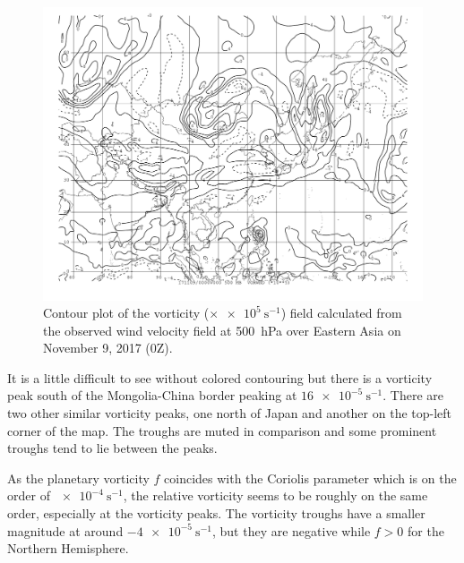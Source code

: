 \documentclass[11pt]{article}
\begin{document}
\begin{figure}[h!]
	\centering
	\includegraphics[width=\textwidth]{vorwnd_obs_500hPa_China}
	\caption{Contour plot of the vorticity ($\times \SI{e5}{\s^{-1}}$) field calculated from the observed wind velocity field at \SI{500}{\hecto\Pa} over Eastern Asia on November 9, 2017 (0Z).}
	\label{fig:vorwnd_obs_500hPa_China}
\end{figure}

It is a little difficult to see without colored contouring but there is a vorticity peak south of the Mongolia-China border peaking at $\SI{16e-5}{\s^{-1}}$. There are two other similar vorticity peaks, one north of Japan and another on the top-left corner of the map. The troughs are muted in comparison and some prominent troughs tend to lie between the peaks.

As the planetary vorticity $f$ coincides with the Coriolis parameter which is on the order of $\SI{e-4}{\s^{-1}}$, the relative vorticity seems to be roughly on the same order, especially at the vorticity peaks. The vorticity troughs have a smaller magnitude at around $\SI{-4e-5}{\s^{-1}}$, but they are negative while $f > 0$ for the Northern Hemisphere.

\end{document}
